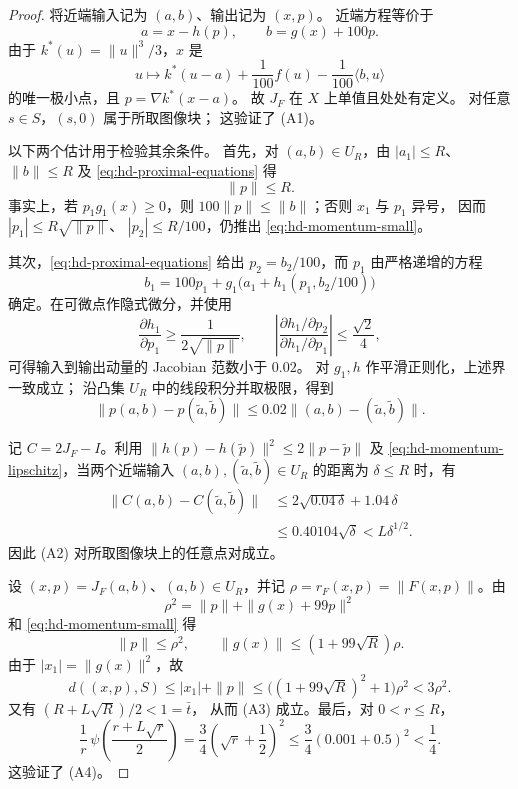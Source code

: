 \begin{proof}
将近端输入记为 $(a,b)$、输出记为 $(x,p)$。
近端方程等价于
\begin{equation}
\label{eq:hd-proximal-equations}
 a=x-h(p),\qquad b=g(x)+100p.
\end{equation}
由于 $k^*(u)=\|u\|^3/3$，$x$ 是
\[
 u\longmapsto
 k^*(u-a)+\frac1{100}f(u)-\frac1{100}\langle b,u\rangle
\]
的唯一极小点，且 $p=\nabla k^*(x-a)$。
故 $J_F$ 在 $X$ 上单值且处处有定义。
对任意 $s\in S$，$(s,0)$ 属于所取图像块；
这验证了 (A1)。

以下两个估计用于检验其余条件。
首先，对 $(a,b)\in U_R$，由
$|a_1|\leq R$、$\|b\|\leq R$ 及
\eqref{eq:hd-proximal-equations} 得
\begin{equation}
\label{eq:hd-momentum-small}
 \|p\|\leq R.
\end{equation}
事实上，若 $p_1g_1(x)\geq0$，则
$100\|p\|\leq\|b\|$；否则 $x_1$ 与 $p_1$ 异号，
因而
$|p_1|\leq R\sqrt{\|p\|}$、
$|p_2|\leq R/100$，仍推出
\eqref{eq:hd-momentum-small}。

其次，\eqref{eq:hd-proximal-equations} 给出
$p_2=b_2/100$，而 $p_1$ 由严格递增的方程
\[
 b_1=100p_1+
 g_1\bigl(a_1+h_1(p_1,b_2/100)\bigr)
\]
确定。在可微点作隐式微分，并使用
\[
 \frac{\partial h_1}{\partial p_1}
       \geq\frac1{2\sqrt{\|p\|}},
 \qquad
 \left|
 \frac{\partial h_1/\partial p_2}
      {\partial h_1/\partial p_1}
 \right|\leq\frac{\sqrt2}{4},
\]
可得输入到输出动量的 Jacobian 范数小于 $0.02$。
对 $g_1,h$ 作平滑正则化，上述界一致成立；
沿凸集 $U_R$ 中的线段积分并取极限，得到
\begin{equation}
\label{eq:hd-momentum-lipschitz}
 \|p(a,b)-p(\tilde a,\tilde b)\|
 \leq0.02\|(a,b)-(\tilde a,\tilde b)\|.
\end{equation}

记 $C=2J_F-I$。利用
$\|h(p)-h(\tilde p)\|^2\leq2\|p-\tilde p\|$
及 \eqref{eq:hd-momentum-lipschitz}，当两个近端输入
$(a,b),(\tilde a,\tilde b)\in U_R$ 的距离为
$\delta\leq R$ 时，有
\[
 \begin{split}
 \|C(a,b)-C(\tilde a,\tilde b)\|
 &\leq 2\sqrt{0.04\,\delta}+1.04\,\delta\\
 &\leq0.40104\sqrt{\delta}
 <L\delta^{1/2}.
 \end{split}
\]
因此 (A2) 对所取图像块上的任意点对成立。

设 $(x,p)=J_F(a,b)$、$(a,b)\in U_R$，并记
$\rho=r_F(x,p)=\|F(x,p)\|$。由
\[
 \rho^2=\|p\|+\|g(x)+99p\|^2
\]
和 \eqref{eq:hd-momentum-small} 得
\[
 \|p\|\leq\rho^2,\qquad
 \|g(x)\|\leq(1+99\sqrt R)\rho.
\]
由于 $|x_1|=\|g(x)\|^2$，故
\[
 d((x,p),S)
 \leq |x_1|+\|p\|
 \leq\bigl((1+99\sqrt R)^2+1\bigr)\rho^2
 <3\rho^2.
\]
又有 $(R+L\sqrt R)/2<1=\bar t$，
从而 (A3) 成立。最后，对 $0<r\leq R$，
\[
 \frac1r\,
 \psi\!\left(\frac{r+L\sqrt r}{2}\right)
 =\frac34\left(\sqrt r+\frac12\right)^2
 \leq\frac34(0.001+0.5)^2
 <\frac14.
\]
这验证了 (A4)。
\end{proof}

